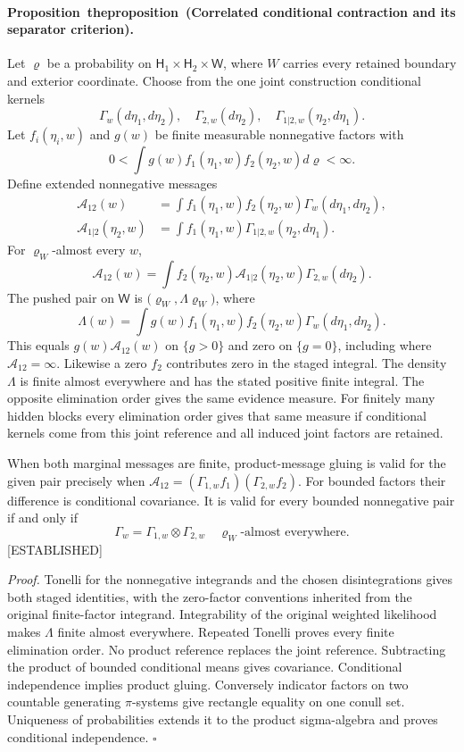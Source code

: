 \documentclass[11pt,letterpaper]{report}
\newcounter{statementsequence}[chapter]
\newcommand{\syncstatementcounter}[1]{\stepcounter{statementsequence}\setcounter{#1}{\numexpr\value{statementsequence}-1\relax}\refstepcounter{#1}}
\newcommand{\resultheading}[4]{\syncstatementcounter{#2}\label{#4}\paragraph{#1~\csname the#2\endcsname\ (#3).}}
\newcommand{\propositionheading}[2]{\resultheading{Proposition}{proposition}{#1}{#2}}
\newcommand{\status}[1]{\mbox{{\small\textsc{\textcolor{red!45!black}{[#1]}}}}}
\begin{document}
\propositionheading{Correlated conditional contraction and its separator criterion}{prop:sf-boundary-gluing}
Let $\varrho$ be a probability on $\mathsf H_1\times\mathsf H_2\times\mathsf W$, where $W$ carries every retained boundary and exterior coordinate. Choose from the one joint construction conditional kernels
\[
\Gamma_w(d\eta_1,d\eta_2),\quad
\Gamma_{2,w}(d\eta_2),\quad
\Gamma_{1|2,w}(\eta_2,d\eta_1).
\]
Let $f_i(\eta_i,w)$ and $g(w)$ be finite measurable nonnegative factors with
\[
0<\int g(w)f_1(\eta_1,w)f_2(\eta_2,w)d\varrho<\infty.
\]
Define extended nonnegative messages
\begin{align}
\mathcal A_{12}(w)&=\int f_1(\eta_1,w)f_2(\eta_2,w)\Gamma_w(d\eta_1,d\eta_2),\\
\mathcal A_{1|2}(\eta_2,w)&=\int f_1(\eta_1,w)\Gamma_{1|2,w}(\eta_2,d\eta_1).
\end{align}
For $\varrho_W$-almost every $w$,
\[
\mathcal A_{12}(w)=\int f_2(\eta_2,w)\mathcal A_{1|2}(\eta_2,w)\Gamma_{2,w}(d\eta_2).
\]
The pushed pair on $\mathsf W$ is $\bigl(\varrho_W,\Lambda\varrho_W\bigr)$, where
\[
\Lambda(w)=\int g(w)f_1(\eta_1,w)f_2(\eta_2,w)\Gamma_w(d\eta_1,d\eta_2).
\]
This equals $g(w)\mathcal A_{12}(w)$ on $\{g>0\}$ and zero on $\{g=0\}$, including where $\mathcal A_{12}=\infty$. Likewise a zero $f_2$ contributes zero in the staged integral. The density $\Lambda$ is finite almost everywhere and has the stated positive finite integral. The opposite elimination order gives the same evidence measure. For finitely many hidden blocks every elimination order gives that same measure if conditional kernels come from this joint reference and all induced joint factors are retained.

When both marginal messages are finite, product-message gluing is valid for the given pair precisely when $\mathcal A_{12}=(\Gamma_{1,w}f_1)(\Gamma_{2,w}f_2)$. For bounded factors their difference is conditional covariance. It is valid for every bounded nonnegative pair if and only if
\[
\Gamma_w=\Gamma_{1,w}\otimes\Gamma_{2,w}
\quad\varrho_W\text{-almost everywhere}.
\]
\status{ESTABLISHED}

\noindent\emph{Proof.}
Tonelli for the nonnegative integrands and the chosen disintegrations gives both staged identities, with the zero-factor conventions inherited from the original finite-factor integrand. Integrability of the original weighted likelihood makes $\Lambda$ finite almost everywhere. Repeated Tonelli proves every finite elimination order. No product reference replaces the joint reference. Subtracting the product of bounded conditional means gives covariance. Conditional independence implies product gluing. Conversely indicator factors on two countable generating $\pi$-systems give rectangle equality on one conull set. Uniqueness of probabilities extends it to the product sigma-algebra and proves conditional independence. $\square$
\end{document}

